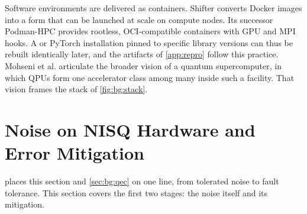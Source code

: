Software environments are delivered as containers. Shifter \cite{gerhardt2017shifter} converts Docker images into a form that can be launched at scale on compute nodes. Its successor Podman-HPC \cite{stephey2022podman} provides rootless, OCI-compatible containers with GPU and MPI hooks. A \cudaq{} or PyTorch installation pinned to specific library versions can thus be rebuilt identically later, and the artifacts of \cref{app:repro} follow this practice. Mohseni et al. \cite{mohseni2024quantumsupercomputer} articulate the broader vision of a quantum supercomputer, in which QPUs form one accelerator class among many inside such a facility. That vision frames the stack of \cref{fig:bg:stack}.

\section{Noise on NISQ Hardware and Error Mitigation}\label{sec:bg:nisq}

 places this section and \cref{sec:bg:qec} on one line, from tolerated noise to fault tolerance. This section covers the first two stages: the noise itself and its mitigation.

